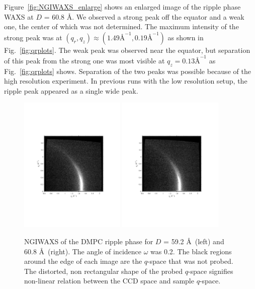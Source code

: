 Figure~\ref{fig:NGIWAXS_enlarge} shows an enlarged image of the ripple 
phase WAXS at $D$ = 60.8 \AA. We observed a strong peak off the 
equator and a weak one, the center of which was not determined. 
The maximum intensity of the strong peak was at 
$(q_r, q_z) \approx (1.49 \text{\AA}^{-1}, 0.19 \text{\AA}^{-1})$ as shown
in Fig.~\ref{fig:qrplots}. The weak peak was observed near the equator, but 
separation of this peak from the strong one was most visible at 
$q_z = 0.13 \textrm{\AA}^{-1}$ as Fig.~\ref{fig:qrplots} shows. Separation
of the two peaks was possible because of the high resolution experiment. 
In previous runs with the low resolution setup, the ripple peak
appeared as a single wide peak.

\begin{figure}[htbp]
  \centering
  \includegraphics[trim=50 170 50 200,clip,width=0.45\textwidth]{figures/ripple/NGIWAXS/dmpc1_046}
  \includegraphics[trim=50 170 50 200,clip,width=0.45\textwidth]{figures/ripple/NGIWAXS/dmpc1_052-060}
  \caption{NGIWAXS of the DMPC ripple phase for $D$ = 59.2 \AA\ (left)
  and 60.8 \AA\ (right). The angle of incidence $\omega$ was 0.2\textdegree.
  The black regions around the edge of each image are the $q$-space that 
  was not probed. The distorted, non rectangular shape of the probed $q$-space
  signifies non-linear relation between the CCD space and sample $q$-space.}
  \label{fig:NGIWAXS}
\end{figure}

